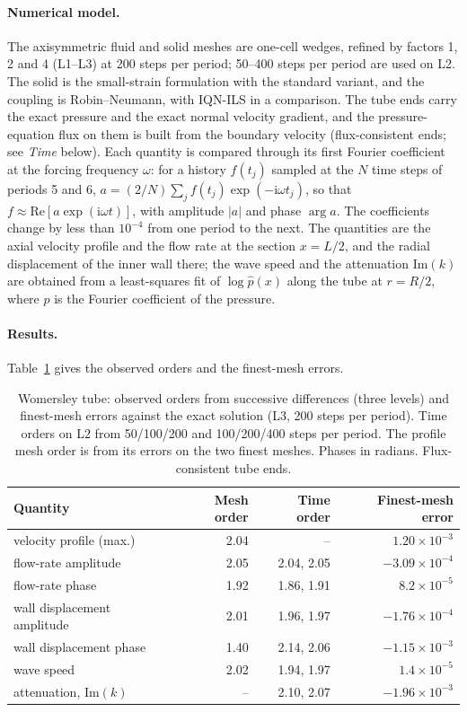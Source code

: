 \paragraph{Numerical model.}
The axisymmetric fluid and solid meshes are one-cell wedges, refined by factors 1, 2 and 4 (L1--L3) at 200 steps per period; 50--400 steps per period are used on L2.
The solid is the small-strain formulation with the standard variant, and the coupling is Robin--Neumann, with IQN-ILS in a comparison.
The tube ends carry the exact pressure and the exact normal velocity gradient, and the pressure-equation flux on them is built from the boundary velocity (flux-consistent ends; see \emph{Time} below).
Each quantity is compared through its first Fourier coefficient at the forcing frequency $\omega$: for a history $f(t_j)$ sampled at the $N$ time steps of periods 5 and 6, $a = (2/N)\sum_j f(t_j)\exp(-\mathrm{i}\omega t_j)$, so that $f \approx \mathrm{Re}[a\exp(\mathrm{i}\omega t)]$, with amplitude $|a|$ and phase $\arg a$.
The coefficients change by less than $10^{-4}$ from one period to the next.
The quantities are the axial velocity profile and the flow rate at the section $x = L/2$, and the radial displacement of the inner wall there; the wave speed and the attenuation $\mathrm{Im}(k)$ are obtained from a least-squares fit of $\log\hat{p}(x)$ along the tube at $r = R/2$, where $\hat{p}$ is the Fourier coefficient of the pressure.

\paragraph{Results.}
Table~\ref{tab:womersley} gives the observed orders and the finest-mesh errors.

\begin{table}[htbp]
	\centering
	\small
	\setlength{\tabcolsep}{4pt}
	\caption{Womersley tube: observed orders from successive differences (three levels) and finest-mesh errors against the exact solution (L3, 200 steps per period). Time orders on L2 from 50/100/200 and 100/200/400 steps per period. The profile mesh order is from its errors on the two finest meshes. Phases in radians. Flux-consistent tube ends.}
	\label{tab:womersley}
	\begin{tabular}{lrrr}
		\toprule
		Quantity & Mesh order & Time order & Finest-mesh error \\
		\midrule
		velocity profile (max.) & 2.04 & -- & $1.20\times10^{-3}$ \\
		flow-rate amplitude & 2.05 & 2.04, 2.05 & $-3.09\times10^{-4}$ \\
		flow-rate phase & 1.92 & 1.86, 1.91 & $8.2\times10^{-5}$ \\
		wall displacement amplitude & 2.01 & 1.96, 1.97 & $-1.76\times10^{-4}$ \\
		wall displacement phase & 1.40 & 2.14, 2.06 & $-1.15\times10^{-3}$ \\
		wave speed & 2.02 & 1.94, 1.97 & $1.4\times10^{-5}$ \\
		attenuation, $\mathrm{Im}(k)$ & -- & 2.10, 2.07 & $-1.96\times10^{-3}$ \\
		\bottomrule
	\end{tabular}
\end{table}

